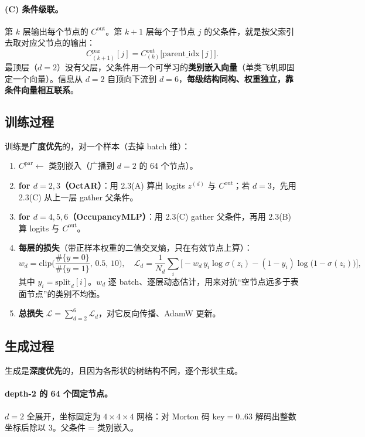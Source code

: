 \documentclass[11pt]{ctexart}
\begin{document}
\paragraph{(C) 条件级联。}
第 $k$ 层输出每个节点的 $C^{\mathrm{out}}$。第 $k{+}1$ 层每个子节点 $j$ 的父条件，就是按父索引去取对应父节点的输出：
\[
C^{\mathrm{par}}_{(k+1)}[j]=C^{\mathrm{out}}_{(k)}\big[\mathrm{parent\_idx}[j]\big].
\]
最顶层（$d=2$）没有父层，父条件用一个可学习的\textbf{类别嵌入向量}（单类飞机即固定一个向量）。信息从 $d{=}2$ 自顶向下流到 $d{=}6$，\textbf{每级结构同构、权重独立，靠条件向量相互联系}。

\subsection{训练过程}

训练是\textbf{广度优先}的，对一个样本（去掉 batch 维）：
\begin{enumerate}[leftmargin=*]
\item $C^{\mathrm{par}}\leftarrow$ 类别嵌入（广播到 $d{=}2$ 的 64 个节点）。
\item \textbf{for $d=2,3$（OctAR）}：用 2.3(A) 算出 logits $z^{(d)}$ 与 $C^{\mathrm{out}}$；若 $d=3$，先用 2.3(C) 从上一层 gather 父条件。
\item \textbf{for $d=4,5,6$（OccupancyMLP）}：用 2.3(C) gather 父条件，再用 2.3(B) 算 logits 与 $C^{\mathrm{out}}$。
\item \textbf{每层的损失}（带正样本权重的二值交叉熵，只在有效节点上算）：
  \[
  w_d=\mathrm{clip}\!\Big(\frac{\#\{y=0\}}{\#\{y=1\}},\,0.5,\,10\Big),\quad
  \mathcal L_d=\frac1{N_d}\sum_{i}\Big[-w_d\,y_i\log\sigma(z_i)-(1-y_i)\log\big(1-\sigma(z_i)\big)\Big],
  \]
  其中 $y_i=\mathrm{split}_d[i]$。$w_d$ 逐 batch、逐层动态估计，用来对抗“空节点远多于表面节点”的类别不均衡。
\item \textbf{总损失} $\mathcal L=\sum_{d=2}^{6}\mathcal L_d$，对它反向传播、AdamW 更新。
\end{enumerate}

\subsection{生成过程}

生成是\textbf{深度优先}的，且因为各形状的树结构不同，逐个形状生成。

\paragraph{depth-2 的 64 个固定节点。}
$d{=}2$ 全展开，坐标固定为 $4\times4\times4$ 网格：对 Morton 码 $\mathrm{key}=0..63$ 解码出整数坐标后除以 3。父条件 = 类别嵌入。
\end{document}
